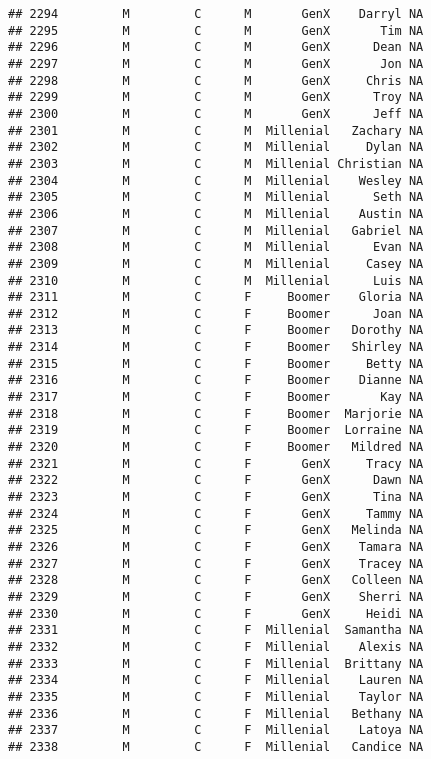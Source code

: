 \documentclass[
]{article}
\begin{document}
\begin{verbatim}
## 2294         M         C      M       GenX    Darryl NA
## 2295         M         C      M       GenX       Tim NA
## 2296         M         C      M       GenX      Dean NA
## 2297         M         C      M       GenX       Jon NA
## 2298         M         C      M       GenX     Chris NA
## 2299         M         C      M       GenX      Troy NA
## 2300         M         C      M       GenX      Jeff NA
## 2301         M         C      M  Millenial   Zachary NA
## 2302         M         C      M  Millenial     Dylan NA
## 2303         M         C      M  Millenial Christian NA
## 2304         M         C      M  Millenial    Wesley NA
## 2305         M         C      M  Millenial      Seth NA
## 2306         M         C      M  Millenial    Austin NA
## 2307         M         C      M  Millenial   Gabriel NA
## 2308         M         C      M  Millenial      Evan NA
## 2309         M         C      M  Millenial     Casey NA
## 2310         M         C      M  Millenial      Luis NA
## 2311         M         C      F     Boomer    Gloria NA
## 2312         M         C      F     Boomer      Joan NA
## 2313         M         C      F     Boomer   Dorothy NA
## 2314         M         C      F     Boomer   Shirley NA
## 2315         M         C      F     Boomer     Betty NA
## 2316         M         C      F     Boomer    Dianne NA
## 2317         M         C      F     Boomer       Kay NA
## 2318         M         C      F     Boomer  Marjorie NA
## 2319         M         C      F     Boomer  Lorraine NA
## 2320         M         C      F     Boomer   Mildred NA
## 2321         M         C      F       GenX     Tracy NA
## 2322         M         C      F       GenX      Dawn NA
## 2323         M         C      F       GenX      Tina NA
## 2324         M         C      F       GenX     Tammy NA
## 2325         M         C      F       GenX   Melinda NA
## 2326         M         C      F       GenX    Tamara NA
## 2327         M         C      F       GenX    Tracey NA
## 2328         M         C      F       GenX   Colleen NA
## 2329         M         C      F       GenX    Sherri NA
## 2330         M         C      F       GenX     Heidi NA
## 2331         M         C      F  Millenial  Samantha NA
## 2332         M         C      F  Millenial    Alexis NA
## 2333         M         C      F  Millenial  Brittany NA
## 2334         M         C      F  Millenial    Lauren NA
## 2335         M         C      F  Millenial    Taylor NA
## 2336         M         C      F  Millenial   Bethany NA
## 2337         M         C      F  Millenial    Latoya NA
## 2338         M         C      F  Millenial   Candice NA

\end{verbatim}
\end{document}
